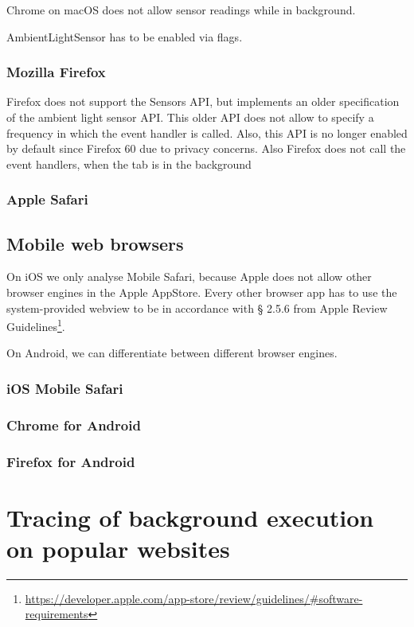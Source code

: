 \documentclass[article,type=bsc,colorback,accentcolor=tud9c]{tudthesis}
\begin{document}
  Chrome on macOS does not allow sensor readings while in background.

  AmbientLightSensor has to be enabled via flags.
  
  \subsubsection{Mozilla Firefox}

  Firefox does not support the Sensors API, but implements an older specification of the ambient light sensor API. This older API does not allow to specify a frequency in which the event handler is called. Also, this API is no longer enabled by default since Firefox 60 due to privacy concerns. Also Firefox does not call the event handlers, when the tab is in the background

  \subsubsection{Apple Safari}

  \subsection{Mobile web browsers}

  On iOS we only analyse Mobile Safari, because Apple does not allow other browser engines in the Apple AppStore. Every other browser app has to use the system-provided webview to be in accordance with § 2.5.6 from Apple Review Guidelines\footnote{\url{https://developer.apple.com/app-store/review/guidelines/\#software-requirements}}.

  On Android, we can differentiate between different browser engines.

  \subsubsection{iOS Mobile Safari}

  \subsubsection{Chrome for Android}

  \subsubsection{Firefox for Android}

  \newpage
  \section{Tracing of background execution on popular websites}
\end{document}
